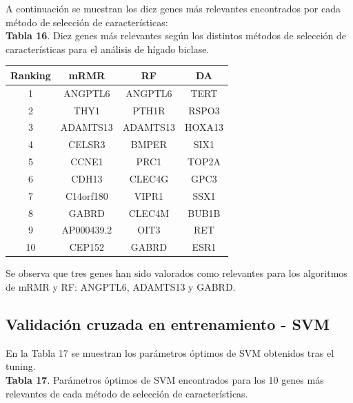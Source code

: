 A continuación se muestran los diez genes más relevantes encontrados por cada método de selección de características:\\

\textbf{Tabla 16}. Diez genes más relevantes según los distintos métodos de selección de características para el análisis de hígado biclase.

\begin{table}[H]
	\centering
	\begin{tabular}{cccc}
		\hline
		\textbf{Ranking} & \textbf{mRMR} & \textbf{RF} & \textbf{DA} \\ \hline
		1                & ANGPTL6       & ANGPTL6     & TERT        \\
		2                & THY1          & PTH1R       & RSPO3       \\
		3                & ADAMTS13      & ADAMTS13    & HOXA13      \\
		4                & CELSR3        & BMPER       & SIX1        \\
		5                & CCNE1         & PRC1        & TOP2A       \\
		6                & CDH13         & CLEC4G      & GPC3        \\
		7                & C14orf180     & VIPR1       & SSX1        \\
		8                & GABRD         & CLEC4M      & BUB1B       \\
		9                & AP000439.2    & OIT3        & RET         \\
		10               & CEP152        & GABRD       & ESR1        \\ \hline
	\end{tabular}
\end{table}

Se observa que tres genes han sido valorados como relevantes para los algoritmos de mRMR y RF:  ANGPTL6, ADAMTS13 y GABRD.

\subsection{Validación cruzada en entrenamiento - SVM}

En la Tabla 17 se muestran los parámetros óptimos de SVM obtenidos tras el tuning.\\

\textbf{Tabla 17}. Parámetros óptimos de SVM encontrados para los 10 genes más relevantes de cada método de selección de características.

